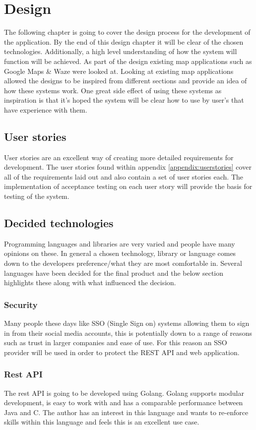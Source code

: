 \section{Design}
The following chapter is going to cover the design process for the development of the application. By the end of this design chapter it will be clear of the chosen technologies. Additionally, a high level understanding of how the system will function will be achieved. As part of the design existing map applications such as Google Maps \& Waze were looked at. Looking at existing map applications allowed the designs to be inspired from different sections and provide an idea of how these systems work. One great side effect of using these systems as inspiration is that it's hoped the system will be clear how to use by user's that have experience with them.

\subsection{User stories}
User stories are an excellent way of creating more detailed requirements for development. The user stories found within appendix \ref{appendix:userstories} cover all of the requirements laid out and also contain a set of user stories each. The implementation of acceptance testing on each user story will provide the basis for testing of the system.

\subsection{Decided technologies}
Programming languages and libraries are very varied and people have many opinions on these. In general a chosen technology, library or language comes down to the developers preference/what they are most comfortable in. Several languages have been decided for the final product and the below section highlights these along with what influenced the decision.

\subsubsection{Security}
Many people these days like SSO (Single Sign on) systems allowing them to sign in from their social media accounts, this is potentially down to a range of reasons such as trust in larger companies and ease of use. For this reason an SSO provider will be used in order to protect the REST API and web application.

\subsubsection{Rest API}
The rest API is going to be developed using Golang. Golang supports modular development, is easy to work with and has a comparable performance between Java and C. The author has an interest in this language and wants to re-enforce skills within this language and feels this is an excellent use case.

